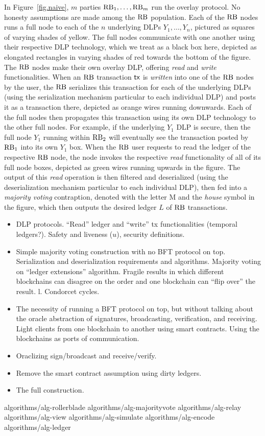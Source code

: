 In Figure~\ref{fig.naive}, $m$ parties $\mathrm{RB}_1, \ldots, \mathrm{RB}_m$ run the overlay protocol.
No honesty assumptions are made among the $\mathrm{RB}$ population. Each of the $\mathrm{RB}$ nodes runs
a full node to each of the $n$ underlying DLPs $Y_1, \ldots, Y_n$, pictured as squares
of varying shades of yellow. The full nodes communicate with one another using their
respective DLP technology, which we treat as a black box here, depicted as elongated
rectangles in varying shades of red towards the bottom of the figure. The $\mathrm{RB}$ nodes
make their own overlay DLP, offering \emph{read} and \emph{write} functionalities.
When an $\mathrm{RB}$ transaction $\textsf{tx}$ is \emph{written} into one of the $\mathrm{RB}$ nodes by the user,
the $\mathrm{RB}$ serializes this transaction for each of the underlying DLPs (using the
serialization mechanism particular to each individual DLP) and posts it
as a transaction there, depicted as orange wires running downwards. Each of the
full nodes then propagates this transaction using its own DLP technology to the
other full nodes. For example, if the underlying $Y_1$ DLP is secure, then
the full node $Y_1$ running within $\mathrm{RB}_2$ will eventually see the transaction
posted by $\mathrm{RB}_1$ into its own $Y_1$ box. When the $\mathrm{RB}$ user requests to read the
ledger of the respective $\mathrm{RB}$ node, the node invokes the respective \emph{read}
functionality of all of its full node boxes, depicted as green wires running upwards
in the figure. The output of this \emph{read} operation is then filtered and deserialized
(using the deserialization mechanism particular to each individual DLP), then fed into a
\emph{majority voting} contraption, denoted with the letter M and the \emph{house} symbol
in the figure, which then outputs the desired ledger $L$ of $\mathrm{RB}$ transactions.

\begin{itemize}
  \item DLP protocols. ``Read'' ledger and ``write'' tx functionalities (temporal ledgers?). Safety and liveness ($u$), security definitions.
  \item Simple majority voting construction with no BFT protocol on top. Serialization and deserialization requirements and algorithms. Majority voting on ``ledger extensions'' algorithm. Fragile results in which different blockchains can disagree on the order and one blockchain can ``flip over'' the result. l. Condorcet cycles.
  \item The necessity of running a BFT protocol on top, but without talking about the oracle abstraction of signatures, broadcasting, verification, and receiving. Light clients from one blockchain to another using smart contracts. Using the blockchains as ports of communication.
  \item Oraclizing sign/broadcast and receive/verify.
  \item Remove the smart contract assumption using dirty ledgers.
  \item The full construction.
\end{itemize}

{algorithms/alg-rollerblade}
{algorithms/alg-majorityvote}
{algorithms/alg-relay}
{algorithms/alg-view}
{algorithms/alg-simulate}
{algorithms/alg-encode}
{algorithms/alg-ledger}
